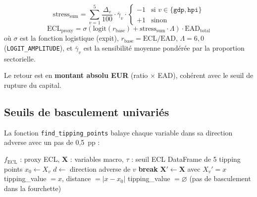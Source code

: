 \documentclass[12pt,a4paper]{article}
\begin{document}
\begin{formulebox}
\begin{equation}
    \text{stress}_{\text{sum}} = \sum_{v=1}^{5}
    \frac{\Delta_v}{100} \cdot \bar{\gamma}_v \cdot
    \begin{cases}
        -1 & \text{si } v \in \{\texttt{gdp}, \texttt{hpi}\} \\
        +1 & \text{sinon}
    \end{cases}
    \label{eq:stress_sum}
\end{equation}
\begin{equation}
    \text{ECL}_{\text{proxy}} = \sigma\!\left(\text{logit}(r_{\text{base}})
    + \text{stress}_{\text{sum}} \cdot \Lambda\right) \cdot \text{EAD}_{\text{total}}
    \label{eq:ecl_proxy}
\end{equation}
o\`u $\sigma$ est la fonction logistique (expit), $r_{\text{base}} = \text{ECL} / \text{EAD}$,
$\Lambda = 6{,}0$ (\texttt{LOGIT\_AMPLITUDE}), et $\bar{\gamma}_v$ est la sensibilit\'e
moyenne pond\'er\'ee par la proportion sectorielle.
\end{formulebox}

Le retour est en \textbf{montant absolu EUR} (ratio $\times$ EAD), coh\'erent
avec le seuil de rupture du capital.

\subsection{Seuils de basculement univari\'es}

La fonction \texttt{find\_tipping\_points} balaye chaque variable dans sa direction
adverse avec un pas de 0,5~pp :

\begin{algorithm}[htbp]
\caption{Recherche de seuils de basculement univari\'es}
\label{alg:tipping}
\begin{algorithmic}[1]
\Require $f_{\text{ECL}}$ : proxy ECL, $\mathbf{X}$ : variables macro, $\tau$ : seuil ECL
\Ensure DataFrame de 5 tipping points
    \State $x_0 \gets X_v$ 
    \State $d \gets$ direction adverse de $v$ 
            \State \textbf{break} 
        \EndIf
        \State $\mathbf{X}' \gets \mathbf{X}$ avec $X_v' = x$
            \State \Return tipping\_value $= x$, distance $= |x - x_0|$
        \EndIf
    \EndFor
    \State tipping\_value $= \varnothing$ (pas de basculement dans la fourchette)
\EndFor
\end{algorithmic}
\end{algorithm}
\end{document}

